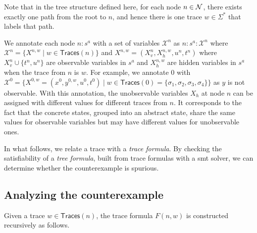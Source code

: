 \documentclass[letterpaper, 10 pt, conference]{ieeeconf}
\begin{document}
Note that in the tree structure defined here, for each node $n\in \cal
N$, there exists exactly one path from the root to $n$, and hence
there is one trace $w \in \Sigma^\ast$ that labels that path.











We annotate each node $n:s^a$ with a set of variables $\mathcal{X}^n$
as $n:s^a:\mathcal{X}^n$ where $\mathcal{X}^n=\{X^{n,w} \mid w\in
\mathsf{Traces}(n) \}$ and $X^{n,w} = (X_v^{n}, X_h^{n,w},
u^{n},t^{n})$ where $X_v^{n} \cup \{t^{n},u^{n} \}$ are observable
variables in $s^a$ and $X_h^{n,w}$ are hidden variables in $s^a$ when
the trace from $n$ is $w$.  For example, we annotate $0$ with
$\mathcal{X}^0=\{X^{0,w} = (x^0, y^{0,w}, u^0, t^0)\mid
w\in\mathsf{Traces}(0) =\{ \sigma_1,\sigma_2,\sigma_3,\sigma_4\}\}$ as
$y$ is not observable.  With this annotation, the unobservable
variables $X_h$ at node $n$ can be assigned with different values for
different traces from $n$. It corresponds to the fact that the
concrete states, grouped into an abstract state, share the same values
for observable variables but may have different values for
unobservable ones.


In what follows, we relate a trace with a \emph{trace formula}. By
checking the satisfiability of a \emph{tree formula}, built from trace
formulas with a \ac{smt} solver, we can determine whether the
counterexample is spurious.

\subsection{Analyzing the counterexample}
Given a trace $w \in \mathsf{Traces}(n)$, the trace formula $F(n,w)$ is
constructed recursively as follows. 
\end{document}
